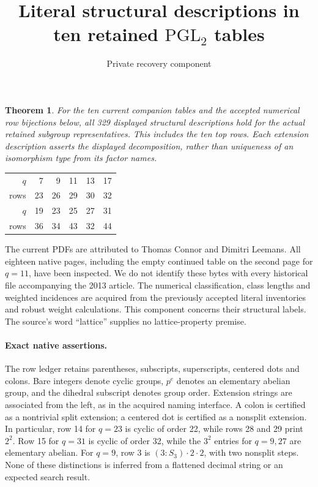 \documentclass[11pt]{article}
\title{Literal structural descriptions in ten retained $\mathrm{PGL}_2$ tables}
\author{Private recovery component}\date{}
\newtheorem{theorem}{Theorem}
\begin{document}
\maketitle
\begin{theorem}
For the ten current companion tables and the accepted numerical row
bijections below, all 329 displayed structural descriptions hold for the
actual retained subgroup representatives. This includes the ten top rows.
Each extension description asserts the displayed decomposition, rather
than uniqueness of an isomorphism type from its factor names.
\end{theorem}
\begin{center}\begin{tabular}{rrrrrr}\toprule
$q$&7&9&11&13&17\\
rows&23&26&29&30&32\\\midrule
$q$&19&23&25&27&31\\
rows&36&34&43&32&44\\\bottomrule
\end{tabular}\end{center}
The current PDFs are attributed to Thomas Connor and Dimitri Leemans.
All eighteen native pages, including the empty continued table on the
second page for $q=11$, have been inspected. We do not identify these bytes
with every historical file accompanying the 2013 article. The numerical
classification, class lengths and weighted incidences are acquired from
the previously accepted literal inventories and robust weight calculations.
This component concerns their structural labels. The source's word
``lattice'' supplies no lattice-property premise.

\paragraph{Exact native assertions.}
The row ledger retains parentheses, subscripts, superscripts, centered dots
and colons. Bare integers denote cyclic groups, $p^e$ denotes an elementary
abelian group, and the dihedral subscript denotes group order. Extension
strings are associated from the left, as in the acquired naming interface.
A colon is certified as a nontrivial split extension; a centered dot is
certified as a nonsplit extension. In particular, row 14 for $q=23$ is
cyclic of order 22, while rows 28 and 29 print $2^2$. Row 15 for $q=31$ is
cyclic of order 32, while the $3^2$ entries for $q=9,27$ are elementary
abelian. For $q=9$, row 3 is $(3:S_3)\mathbin{\cdot}2\mathbin{\cdot}2$,
with two nonsplit steps. None of these distinctions is inferred from a
flattened decimal string or an expected search result.
\end{document}
